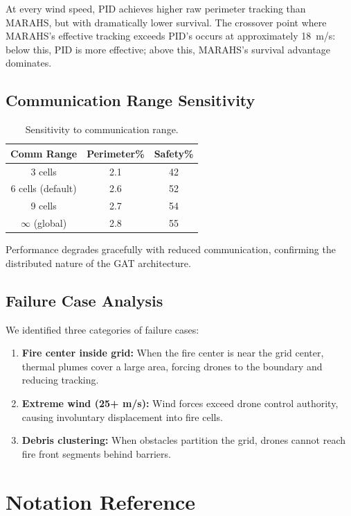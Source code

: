 \documentclass[12pt,a4paper]{article}
\begin{document}
At every wind speed, PID achieves higher raw perimeter tracking than MARAHS, but with dramatically lower survival. The crossover point where MARAHS's effective tracking exceeds PID's occurs at approximately 18~m/s: below this, PID is more effective; above this, MARAHS's survival advantage dominates.

\subsection{Communication Range Sensitivity}

\begin{table}[t]
\centering
\caption{Sensitivity to communication range.}
\label{tab:comm_sensitivity}
\begin{tabular}{ccc}
\toprule
\textbf{Comm Range} & \textbf{Perimeter\%} & \textbf{Safety\%} \\
\midrule
3 cells   & 2.1 & 42 \\
6 cells (default) & 2.6 & 52 \\
9 cells   & 2.7 & 54 \\
$\infty$ (global) & 2.8 & 55 \\
\bottomrule
\end{tabular}
\end{table}

Performance degrades gracefully with reduced communication, confirming the distributed nature of the GAT architecture.

\subsection{Failure Case Analysis}

We identified three categories of failure cases:

\begin{enumerate}[leftmargin=*]
    \item \textbf{Fire center inside grid:} When the fire center is near the grid center, thermal plumes cover a large area, forcing drones to the boundary and reducing tracking.
    \item \textbf{Extreme wind (25+ m/s):} Wind forces exceed drone control authority, causing involuntary displacement into fire cells.
    \item \textbf{Debris clustering:} When obstacles partition the grid, drones cannot reach fire front segments behind barriers.
\end{enumerate}


\section{Notation Reference}
\label{app:notation}
\end{document}
